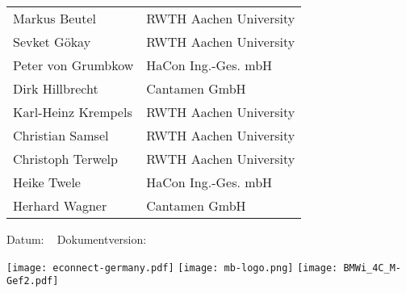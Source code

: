 \begin{titlepage}

\begin{huge}
\bfseries\center
\thistitle

\end{huge}

\vspace{2em}

\begin{large}
\bfseries\noindent
\begin{tabular}{@{}ll@{}}
  Markus Beutel & RWTH Aachen University \\
  Sevket Gökay & RWTH Aachen University \\
  Peter von Grumbkow & HaCon Ing.-Ges. mbH \\
  Dirk Hillbrecht & Cantamen GmbH \\
  Karl-Heinz Krempels & RWTH Aachen University \\
  Christian Samsel & RWTH Aachen University \\
  Christoph Terwelp & RWTH Aachen University \\
  Heike Twele & HaCon Ing.-Ges. mbH \\
  Herhard Wagner & Cantamen GmbH \\
\end{tabular}


\end{large}

\vspace{2em}

Datum: \thisdate ~ Dokumentversion: \thisversion

\vspace{2em}

\thisabstract
\vspace{2em}
\vfill

\texttt{[image: econnect-germany.pdf]} \hspace{1.5em}
\texttt{[image: mb-logo.png]}
\hfill \texttt{[image: BMWi\_4C\_M-Gef2.pdf]}


\end{titlepage}
